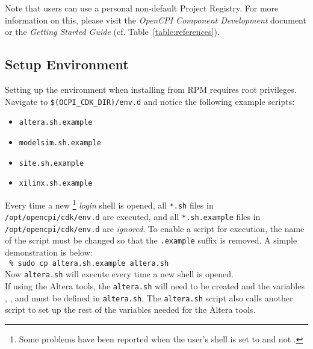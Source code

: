 Note that users can use a personal non-default Project Registry. For more information on this, please visit the \textit{OpenCPI Component Development} document or the \textit{Getting Started Guide} (cf. Table~\ref{table:references}).

\subsection{Setup Environment} \label{setenv}
\label{subsec:setup_environment}
\begin{center}
\end{center}

Setting up the environment when installing from RPM requires root privileges. Navigate to \verb+$(OCPI_CDK_DIR)/env.d+ and notice the following example scripts:

\begin{itemize}
 	\item \verb+altera.sh.example+
 	\item \verb+modelsim.sh.example+
 	\item \verb+site.sh.example+
 	\item \verb+xilinx.sh.example+
\end{itemize}

Every time a new \footnote{Some problems have been reported when the user's shell is set to  and not .} \textit{login} shell is opened, all \verb+*.sh+ files in \verb+/opt/opencpi/cdk/env.d+ are executed, and all \verb+*.sh.example+ files in \verb+/opt/opencpi/cdk/env.d+ are \textit{ignored}. To enable a script for execution, the name of the script must be changed so that the \verb+.example+ suffix is removed. A simple demonstration is below:\\

\verb+ % sudo cp altera.sh.example altera.sh+\\

Now \verb+altera.sh+ will execute every time a new shell is opened.\\

If using the Altera tools, the \verb+altera.sh+ will need to be created and the variables , , and  must be defined in \verb+altera.sh+. The \verb+altera.sh+ script also calls another script to set up the rest of the variables needed for the Altera tools.\\

